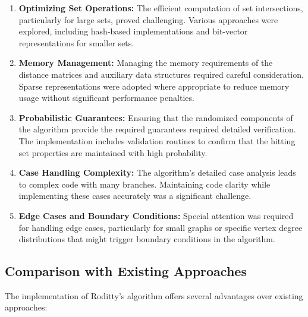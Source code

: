 \documentclass[a4paper,11pt,oneside]{book}
\begin{document}
\begin{enumerate}
    \item \textbf{Optimizing Set Operations:} The efficient computation of set intersections, particularly for large sets, proved challenging. Various approaches were explored, including hash-based implementations and bit-vector representations for smaller sets.
    
    \item \textbf{Memory Management:} Managing the memory requirements of the distance matrices and auxiliary data structures required careful consideration. Sparse representations were adopted where appropriate to reduce memory usage without significant performance penalties.
    
    \item \textbf{Probabilistic Guarantees:} Ensuring that the randomized components of the algorithm provide the required guarantees required detailed verification. The implementation includes validation routines to confirm that the hitting set properties are maintained with high probability.
    
    \item \textbf{Case Handling Complexity:} The algorithm's detailed case analysis leads to complex code with many branches. Maintaining code clarity while implementing these cases accurately was a significant challenge.
    
    \item \textbf{Edge Cases and Boundary Conditions:} Special attention was required for handling edge cases, particularly for small graphs or specific vertex degree distributions that might trigger boundary conditions in the algorithm.
\end{enumerate}

\subsection{Comparison with Existing Approaches}

The implementation of Roditty's algorithm offers several advantages over existing approaches:\\
\end{document}
